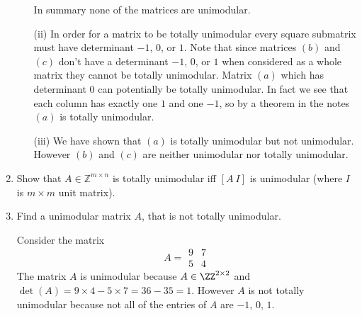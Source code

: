 \documentclass[11pt, oneside]{article}
\begin{document}
\begin{enumerate}
\begin{enumerate}
        In summary none of the matrices are unimodular.

      \item[(ii)]
        In order for a matrix to be totally unimodular every square submatrix
        must have determinant $-1$, $0$, or $1$.
        Note that since matrices $(b)$ and $(c)$ don't have a determinant
        $-1$, $0$, or $1$ when considered as a whole matrix they cannot be
        totally unimodular.
        Matrix $(a)$ which has determinant 0 can potentially be totally
        unimodular.
        In fact we see that each column has exactly one $1$ and one $-1$, so
        by a theorem in the notes $(a)$ is totally unimodular.

      \item[(iii)]
        We have shown that $(a)$ is totally unimodular but not unimodular.
        However $(b)$ and $(c)$ are neither unimodular nor totally unimodular.
    \end{enumerate}

  \item %
    Show that $A \in \mathbb{Z}^{m \times n}$ is totally unimodular iff $[A\ I]$
    is unimodular (where $I$ is $m \times m$ unit matrix).

  \item %
    Find a unimodular matrix $A$, that is not totally unimodular.

    Consider the matrix
    \[
      A =
      \begin{matrix}
        9 & 7 \\
        5 & 4
      \end{matrix}
    \]
    The matrix $A$ is unimodular because
    $A \in \ZZ^{2 \times 2}$ and
    $\det(A) = 9 \times 4 - 5 \times 7 = 36 - 35 = 1$.
    However $A$ is not totally unimodular because not all of the
    entries of $A$ are $-1$, $0$, $1$.
\end{enumerate}
\end{document}
